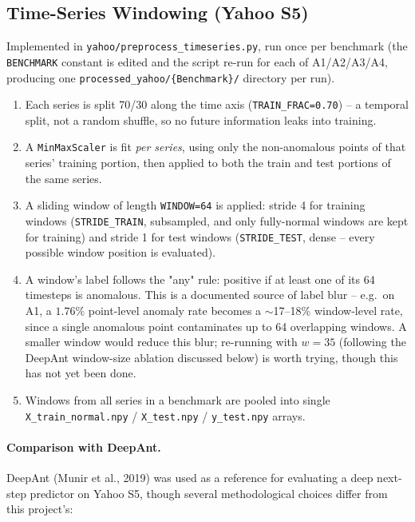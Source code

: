 \subsection{Time-Series Windowing (Yahoo S5)}

Implemented in \texttt{yahoo/preprocess\_timeseries.py}, run once per benchmark (the \texttt{BENCHMARK} constant is edited and the script re-run for each of A1/A2/A3/A4, producing one \texttt{processed\_yahoo/\{Benchmark\}/} directory per run).

\begin{enumerate}
  \item Each series is split 70/30 along the time axis (\texttt{TRAIN\_FRAC=0.70}) -- a temporal split, not a random shuffle, so no future information leaks into training.
  \item A \texttt{MinMaxScaler} is fit \emph{per series}, using only the non-anomalous points of that series' training portion, then applied to both the train and test portions of the same series.
  \item A sliding window of length \texttt{WINDOW=64} is applied: stride 4 for training windows (\texttt{STRIDE\_TRAIN}, subsampled, and only fully-normal windows are kept for training) and stride 1 for test windows (\texttt{STRIDE\_TEST}, dense -- every possible window position is evaluated).
  \item A window's label follows the "any" rule: positive if at least one of its 64 timesteps is anomalous. This is a documented source of label blur -- e.g.\ on A1, a $1.76\%$ point-level anomaly rate becomes a $\sim$17--18\% window-level rate, since a single anomalous point contaminates up to 64 overlapping windows. A smaller window would reduce this blur; re-running with $w=35$ (following the DeepAnt window-size ablation discussed below) is worth trying, though this has not yet been done.
  \item Windows from all series in a benchmark are pooled into single \texttt{X\_train\_normal.npy} / \texttt{X\_test.npy} / \texttt{y\_test.npy} arrays.
\end{enumerate}

\paragraph{Comparison with DeepAnt.} DeepAnt (Munir et al., 2019) was used as a reference for evaluating a deep next-step predictor on Yahoo S5, though several methodological choices differ from this project's:

